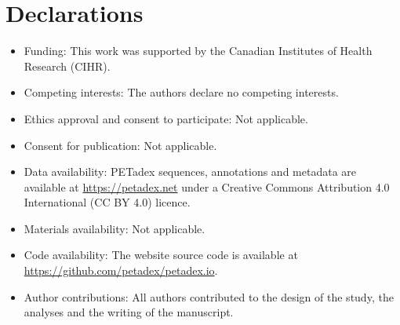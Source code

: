 \documentclass[pdflatex,sn-nature,iicol]{sn-jnl}%
\begin{document}
\section*{Declarations}

\begin{itemize}
\item Funding: This work was supported by the Canadian Institutes of Health Research (CIHR).
\item Competing interests: The authors declare no competing interests.
\item Ethics approval and consent to participate: Not applicable.
\item Consent for publication: Not applicable.
\item Data availability: PETadex sequences, annotations and metadata are available at \url{https://petadex.net} under a Creative Commons Attribution 4.0 International (CC BY 4.0) licence.
\item Materials availability: Not applicable.
\item Code availability: The website source code is available at \url{https://github.com/petadex/petadex.io}.
\item Author contributions: All authors contributed to the design of the study, the analyses and the writing of the manuscript.
\end{itemize}
\end{document}
